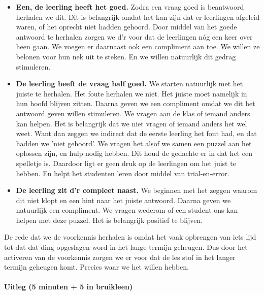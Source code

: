 \documentclass{article}
\begin{document}
                    \begin{itemize}
                        \item{\textbf{Een, de leerling heeft het goed.}
                            Zodra een vraag goed is beantwoord herhalen we dit. Dit is belangrijk omdat het kan zijn dat er leerlingen afgeleid waren, of het oprecht niet hadden gehoord. Door middel van het goede antwoord te herhalen zorgen we d'r voor dat de leerlingen nóg een keer over heen gaan. We voegen er daarnaast ook een compliment aan toe. We willen ze belonen voor hun nek uit te steken. En we willen natuurlijk dit gedrag stimuleren. 
                        }
                        \item{\textbf{De leerling heeft de vraag half goed.}
                            We starten natuurlijk met het juiste te herhalen. Het foute herhalen we niet. Het juiste moet namelijk in hun hoofd blijven zitten. Daarna geven we een compliment omdat we dit het antwoord geven willen stimuleren. We vragen aan de klas of iemand anders kan helpen. Het is belangrijk dat we niet vragen of iemand anders het wel weet. Want dan zeggen we indirect dat de eerste leerling het fout had, en dat hadden we 'niet gehoord'. We vragen het alsof we samen een puzzel aan het oplossen zijn, en hulp nodig hebben. Dit houd de gedachte er in dat het een spelletje is. Daardoor ligt er geen druk op de leerlingen om het juist te hebben.\cite{games-help} En helpt het studenten leren door middel van trial-en-error.\cite{games-help}
                        }
                        \item{\textbf{De leerling zit d'r compleet naast.}
                            We beginnen met het zeggen waarom dit niet klopt en een hint naar het juiste antwoord. Daarna geven we natuurlijk een compliment. We vragen wederom of een student ons kan helpen met deze puzzel. Het is belangrijk positief te blijven.
                        }
                    \end{itemize}

                    De rede dat we de voorkennis herhalen is omdat het vaak opbrengen van iets lijd tot dat dat ding opgeslagen word in het lange termijn geheugen.\cite{repeating-leads-to-long-term-memory} Dus door het activeren van de voorkennis zorgen we er voor dat de les stof in het langer termijn geheugen komt. Precies waar we het willen hebben.
                
                \bigskip\noindent\paragraph{Uitleg (5 minuten + 5 in bruikleen)}
                
\end{document}
